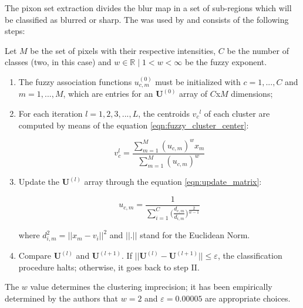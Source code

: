 The pixon set extraction divides the blur map in a set of sub-regions which will be classified as blurred or sharp. The  was used by  and consists of the following steps:

Let $M$ be the set of pixels with their respective intensities, $C$ be the number of classes (two, in this case) and $w\in \mathbb{R} \mid 1 < w < \infty$ be the fuzzy exponent.

\begin{enumerate}[label=\Roman*.]

    \item The fuzzy association functions $u_ {c, m}^{(0)}$ must be initialized with $c = {1,..., C}$ and $m = {1, ..., M}$, which are entries for an $\mathbf{U}^{(0)}$ array of $C$x$M$ dimensions;
    
    \item For each iteration $l = {1,2,3,...,L}$, the centroids ${v_ {c}}^{l}$ of each cluster are computed by means of the equation \ref{eqn:fuzzy_cluster_center}:
    
    \begin{equation}
    \label{eqn:fuzzy_cluster_center}
    	v_{c}^{l} = \frac{\sum_{m=1}^{M}(u_{c,m})^{w}x_m}{\sum_{m=1}^{M}(u_{c,m})^{w}}
    \end{equation}

    \item Update the $\mathbf{U}^{(l)}$ array through the equation \ref{eqn:update_matrix}:
    
    \begin{equation}
    \label{eqn:update_matrix}
    	u_{c,m} = \frac{1}{\sum_{i=1}^{C}\Big(\frac{d_{c,m}}{d_{i,m}}\Big)^{\frac{2}{w-1}}}
    \end{equation}
    
    \noindent where $d_{i,m}^2 = ||x_m - v_i||^2$ and $||.||$ stand for the Euclidean Norm.
    
    \item Compare $\mathbf{U}^{(l)}$ and $\mathbf{U}^{(l+1)}$. If $||\mathbf{U}^{(l)} - \mathbf{U}^{(l+1)}|| \leq \varepsilon$, the classification procedure halts; otherwise, it goes back to step II.

\end{enumerate}

\noindent The $w$ value determines the clustering imprecision; it has been empirically determined by the authors that $w = 2$ and $\varepsilon = 0.00005$ are appropriate choices.

